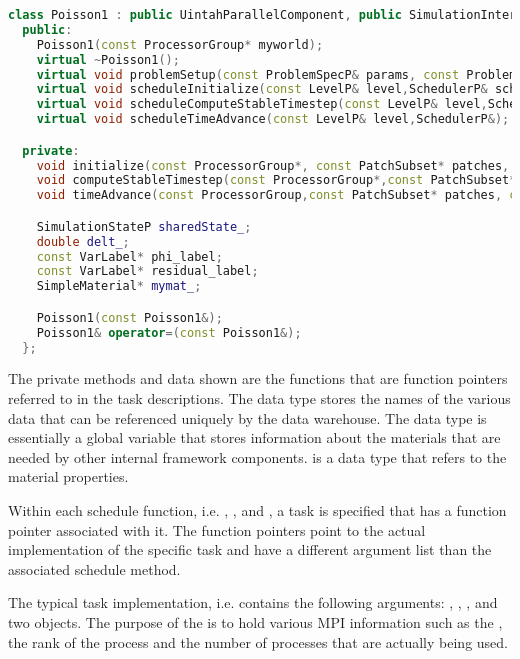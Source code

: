\begin{lstlisting}[language=Cpp]
  class Poisson1 : public UintahParallelComponent, public SimulationInterface {
  public:
    Poisson1(const ProcessorGroup* myworld);
    virtual ~Poisson1();
    virtual void problemSetup(const ProblemSpecP& params, const ProblemSpecP& restart_prob_spec, GridP& grid, SimulationStateP&);
    virtual void scheduleInitialize(const LevelP& level,SchedulerP& sched);
    virtual void scheduleComputeStableTimestep(const LevelP& level,SchedulerP&);
    virtual void scheduleTimeAdvance(const LevelP& level,SchedulerP&);

  private:
    void initialize(const ProcessorGroup*, const PatchSubset* patches, const MaterialSubset* matls, DataWarehouse* old_dw, DataWarehouse* new_dw);
    void computeStableTimestep(const ProcessorGroup*,const PatchSubset* patches, const MaterialSubset* matls,DataWarehouse* old_dw, DataWarehouse* new_dw);
    void timeAdvance(const ProcessorGroup,const PatchSubset* patches, const MaterialSubset* matls,DataWarehouse* old_dw, DataWarehouse* new_dw);

    SimulationStateP sharedState_;
    double delt_;
    const VarLabel* phi_label;
    const VarLabel* residual_label;
    SimpleMaterial* mymat_;

    Poisson1(const Poisson1&);
    Poisson1& operator=(const Poisson1&);
  };
\end{lstlisting}

The private methods and data shown are the functions that are function
pointers referred to in the task descriptions.  The 
data type stores the names of the various data that can be referenced
uniquely by the data warehouse.  The  data
type is essentially a global variable that stores information about
the materials that are needed by other internal \Vaango framework
components.   is a data type that refers to the
material properties.

Within each schedule function, i.e. ,
, and
, a task is specified that has a function
pointer associated with it.  The function pointers point to the actual
implementation of the specific task and have a different argument list
than the associated schedule method.

The typical task implementation, i.e.  contains
the following arguments: ,
, , and two
 objects.  The purpose of the
 is to hold various MPI information such as the
, the rank of the process and the number of
processes that are actually being used.

